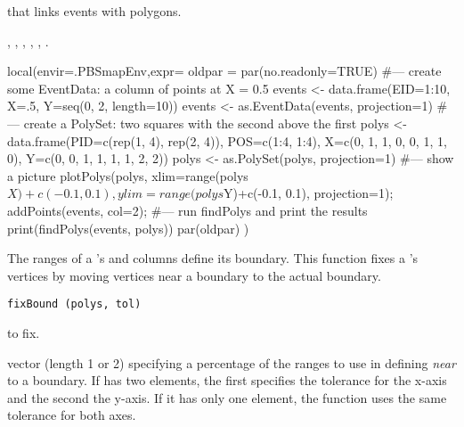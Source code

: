 \documentclass[letterpaper]{book}
\begin{document}
%
\begin{Value}
 that links events with polygons.
\end{Value}
%
\begin{SeeAlso}\relax
{},
,
,
,
,
.
\end{SeeAlso}
%
\begin{Examples}
\begin{ExampleCode}
local(envir=.PBSmapEnv,expr={
  oldpar = par(no.readonly=TRUE)
  #--- create some EventData: a column of points at X = 0.5
  events <- data.frame(EID=1:10, X=.5, Y=seq(0, 2, length=10))
  events <- as.EventData(events, projection=1)
  #--- create a PolySet: two squares with the second above the first
  polys <- data.frame(PID=c(rep(1, 4), rep(2, 4)), POS=c(1:4, 1:4),
    X=c(0, 1, 1, 0, 0, 1, 1, 0),
    Y=c(0, 0, 1, 1, 1, 1, 2, 2))
  polys <- as.PolySet(polys, projection=1)
  #--- show a picture
  plotPolys(polys, xlim=range(polys$X)+c(-0.1, 0.1),
    ylim=range(polys$Y)+c(-0.1, 0.1), projection=1);
  addPoints(events, col=2);
  #--- run findPolys and print the results
  print(findPolys(events, polys))
  par(oldpar)
})
\end{ExampleCode}
\end{Examples}
%
\begin{Description}\relax
The ranges of a 's  and  columns define
its boundary.  This function fixes a 's vertices by
moving vertices near a boundary to the actual boundary.
\end{Description}
%
\begin{Usage}
\begin{verbatim}
fixBound (polys, tol)
\end{verbatim}
\end{Usage}
%
\begin{Arguments}
\begin{ldescription}
\item[\code{polys}]  to fix.
\item[\code{tol}] vector (length 1 or 2) specifying a percentage of
the ranges to use in defining \emph{near} to a boundary. If
 has two elements, the first specifies the tolerance for
the x-axis and the second the y-axis.  If it has only one element,
the function uses the same tolerance for both axes.
\end{ldescription}
\end{Arguments}
\end{document}
